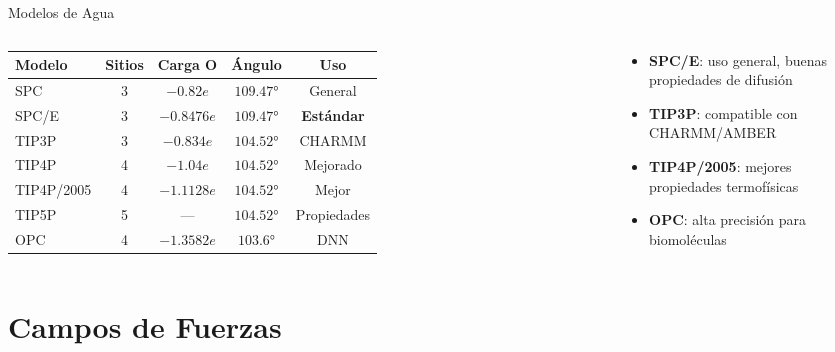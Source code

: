 \documentclass[aspectratio=169, 10pt]{beamer}
\begin{document}
\begin{frame}{Modelos de Agua}

\begin{columns}[T]
\begin{table}[h]
\centering
\footnotesize
\begin{tabular}{@{}lcccc@{}}
\toprule
\textbf{Modelo} & \textbf{Sitios} & \textbf{Carga O} & \textbf{Ángulo} & \textbf{Uso} \\
\midrule
SPC      & 3 & $-0.82e$ & $109.47°$ & General \\
SPC/E    & 3 & $-0.8476e$ & $109.47°$ & \textbf{Estándar} \\
TIP3P    & 3 & $-0.834e$ & $104.52°$ & CHARMM \\
TIP4P    & 4 & $-1.04e$ & $104.52°$ & Mejorado \\
TIP4P/2005 & 4 & $-1.1128e$ & $104.52°$ & Mejor \\
TIP5P    & 5 & --- & $104.52°$ & Propiedades \\
OPC      & 4 & $-1.3582e$ & $103.6°$ & DNN \\
\bottomrule
\end{tabular}
\end{table}

\begin{tcolorbox}[definitionbox, title={Recomendaciones}]
\small
\begin{itemize}
  \item \textbf{SPC/E}: uso general, buenas propiedades de difusión
  \item \textbf{TIP3P}: compatible con CHARMM/AMBER
  \item \textbf{TIP4P/2005}: mejores propiedades termofísicas
  \item \textbf{OPC}: alta precisión para biomoléculas
\end{itemize}
\end{tcolorbox}
\end{columns}
\end{frame}

\section{Campos de Fuerzas}
\end{document}
